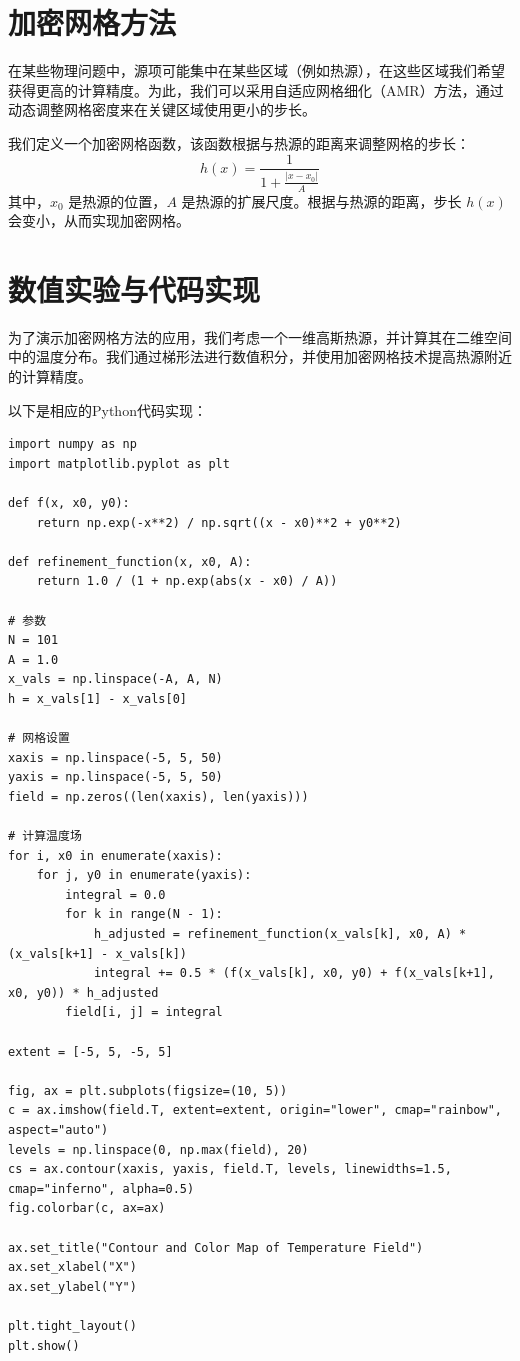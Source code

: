 \documentclass[12pt]{article}
\begin{document}
\section{加密网格方法}
在某些物理问题中，源项可能集中在某些区域（例如热源），在这些区域我们希望获得更高的计算精度。为此，我们可以采用自适应网格细化（AMR）方法，通过动态调整网格密度来在关键区域使用更小的步长。

我们定义一个加密网格函数，该函数根据与热源的距离来调整网格的步长：
\[
h(x) = \frac{1}{1 + \frac{|x - x_0|}{A}}
\]
其中，\( x_0 \) 是热源的位置，\( A \) 是热源的扩展尺度。根据与热源的距离，步长 \( h(x) \) 会变小，从而实现加密网格。

\section{数值实验与代码实现}
为了演示加密网格方法的应用，我们考虑一个一维高斯热源，并计算其在二维空间中的温度分布。我们通过梯形法进行数值积分，并使用加密网格技术提高热源附近的计算精度。

以下是相应的Python代码实现：

\begin{verbatim}
import numpy as np
import matplotlib.pyplot as plt

def f(x, x0, y0):
    return np.exp(-x**2) / np.sqrt((x - x0)**2 + y0**2)

def refinement_function(x, x0, A):
    return 1.0 / (1 + np.exp(abs(x - x0) / A))

# 参数
N = 101
A = 1.0
x_vals = np.linspace(-A, A, N)
h = x_vals[1] - x_vals[0]

# 网格设置
xaxis = np.linspace(-5, 5, 50)
yaxis = np.linspace(-5, 5, 50)
field = np.zeros((len(xaxis), len(yaxis)))  

# 计算温度场
for i, x0 in enumerate(xaxis):
    for j, y0 in enumerate(yaxis):
        integral = 0.0
        for k in range(N - 1):
            h_adjusted = refinement_function(x_vals[k], x0, A) * (x_vals[k+1] - x_vals[k])
            integral += 0.5 * (f(x_vals[k], x0, y0) + f(x_vals[k+1], x0, y0)) * h_adjusted
        field[i, j] = integral

extent = [-5, 5, -5, 5]

fig, ax = plt.subplots(figsize=(10, 5))
c = ax.imshow(field.T, extent=extent, origin="lower", cmap="rainbow", aspect="auto")
levels = np.linspace(0, np.max(field), 20)
cs = ax.contour(xaxis, yaxis, field.T, levels, linewidths=1.5, cmap="inferno", alpha=0.5)
fig.colorbar(c, ax=ax)

ax.set_title("Contour and Color Map of Temperature Field")
ax.set_xlabel("X")
ax.set_ylabel("Y")

plt.tight_layout()
plt.show()
\end{verbatim}
\end{document}
